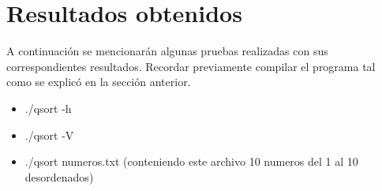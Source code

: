 \documentclass[a4paper,10pt]{article}
\numberwithin{equation}{section}
\numberwithin{figure}{section}
\begin{document}
\section{Resultados obtenidos}


A continuación se mencionarán algunas pruebas realizadas con sus correspondientes resultados. Recordar previamente compilar el programa tal como se explicó en la sección anterior.

\begin{itemize}
\item  ./qsort -h
\end{itemize}
\noindent{}


\begin{itemize}
\item  ./qsort -V
\end{itemize}
\noindent{}

\begin{itemize}
\item  ./qsort numeros.txt (conteniendo este archivo 10 numeros del 1 al 10 desordenados)
\end{itemize}
\noindent{}
\end{document}
